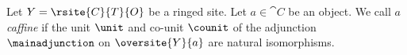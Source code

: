 \begin{definition}[Caffine]
Let $Y = \rsite{C}{T}{O}$ be a ringed site.
Let $a\in \cat{C}$ be an object. 
We call $a$ \emph{caffine} 
if the unit $\unit$ and co-unit $\counit$ of the adjunction $\mainadjunction$ on $\oversite{Y}{a}$ are natural isomorphisms.
\end{definition}